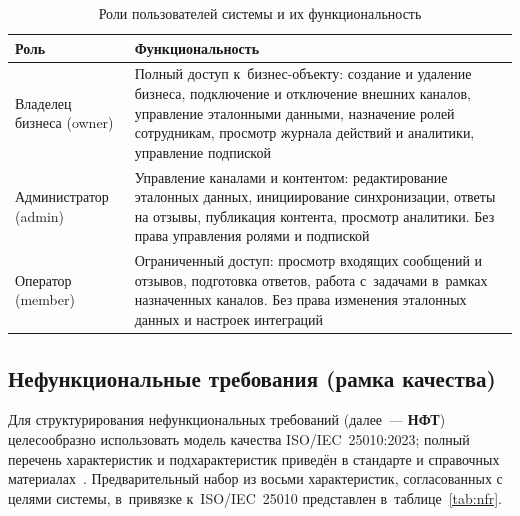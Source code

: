 \begin{table}[H]
  \caption{Роли пользователей системы и их функциональность}
  \label{tab:roles}
  \small
  \begin{tabularx}{\textwidth}{|p{3cm}|X|}
    \hline
    \textbf{Роль} & \textbf{Функциональность} \\
    \hline
    Владелец бизнеса (owner) & Полный доступ к~бизнес-объекту: создание и удаление бизнеса, подключение и отключение внешних каналов, управление эталонными данными, назначение ролей сотрудникам, просмотр журнала действий и аналитики, управление подпиской \\
    \hline
    Администратор (admin) & Управление каналами и контентом: редактирование эталонных данных, инициирование синхронизации, ответы на отзывы, публикация контента, просмотр аналитики. Без права управления ролями и подпиской \\
    \hline
    Оператор (member) & Ограниченный доступ: просмотр входящих сообщений и отзывов, подготовка ответов, работа с~задачами в~рамках назначенных каналов. Без права изменения эталонных данных и настроек интеграций \\
    \hline
  \end{tabularx}
\end{table}

\subsection{Нефункциональные требования (рамка качества)}
\label{subsec:nonfunctional-req}

Для структурирования нефункциональных требований (далее~--- \textbf{НФТ}) целесообразно использовать модель качества ISO/IEC~25010:2023; полный перечень характеристик и подхарактеристик приведён в стандарте и справочных материалах~\cite{src:9, src:10}. Предварительный набор из восьми характеристик, согласованных с целями системы, в~привязке к~ISO/IEC~25010 представлен в~\mbox{таблице}~\ref{tab:nfr}.

